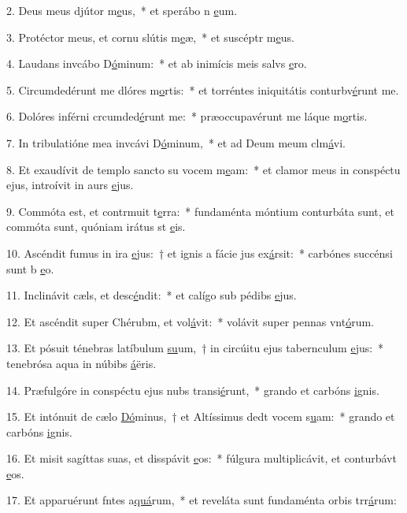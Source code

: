 2. Deus meus djútor m\uline{e}us,~* et sperábo n \uline{e}um.\par 
3. Protéctor meus, et cornu slútis m\uline{e}æ,~* et suscéptr m\uline{e}us.\par 
4. Laudans invcábo D\uline{ó}minum:~* et ab inimícis meis salvs \uline{e}ro.\par 
5. Circumdedérunt me dlóres m\uline{o}rtis:~* et torréntes iniquitátis conturbv\uline{é}runt me.\par 
6. Dolóres inférni crcumded\uline{é}runt me:~* præoccupavérunt me láque m\uline{o}rtis.\par 
7. In tribulatióne mea invcávi D\uline{ó}minum,~* et ad Deum meum clm\uline{á}vi.\par 
8. Et exaudívit de templo sancto su vocem m\uline{e}am:~* et clamor meus in conspéctu ejus, introívit in aurs \uline{e}jus.\par 
9. Commóta est, et contrmuit t\uline{e}rra:~* fundaménta móntium conturbáta sunt, et commóta sunt, quóniam irátus st \uline{e}is.\par 
10. Ascéndit fumus in ira \uline{e}jus:~† et ignis a fácie jus ex\uline{á}rsit:~* carbónes succénsi sunt b \uline{e}o.\par 
11. Inclinávit cæls, et desc\uline{é}ndit:~* et calígo sub pédibs \uline{e}jus.\par 
12. Et ascéndit super Chérubm, et vol\uline{á}vit:~* volávit super pennas vnt\uline{ó}rum.\par 
13. Et pósuit ténebras latíbulum \uline{su}um,~† in circúitu ejus tabernculum \uline{e}jus:~* tenebrósa aqua in núbibs \uline{á}ëris.\par 
14. Præfulgóre in conspéctu ejus nubs transi\uline{é}runt,~* grando et carbóns \uline{i}gnis.\par 
15. Et intónuit de cælo \uline{Dó}minus,~† et Altíssimus dedt vocem s\uline{u}am:~* grando et carbóns \uline{i}gnis.\par 
16. Et misit sagíttas suas, et disspávit \uline{e}os:~* fúlgura multiplicávit, et conturbávt \uline{e}os.\par 
17. Et apparuérunt fntes a\uline{quá}rum,~* et reveláta sunt fundaménta orbis trr\uline{á}rum:\par 
